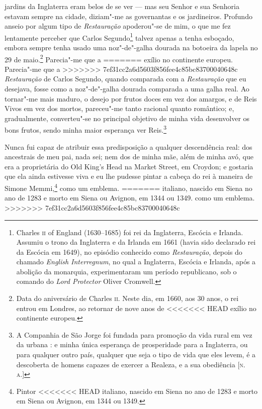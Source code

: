 {{{{{{{{{{jardins da Inglaterra eram belos de se ver --- mas seu Senhor e sua
Senhoria estavam sempre na cidade, diziam"-me as governantas e os
jardineiros. Profundo anseio por algum tipo de \textit{Restauração}
apoderou"-se de mim, o que me fez lentamente perceber que Carlos
Segundo\footnote{Charles \textsc{ii} of England (1630--1685) foi rei da Inglaterra, Escócia e Irlanda. Assumiu o trono da Inglaterra e da Irlanda em 1661
  (havia sido declarado rei da Escócia em 1649), no episódio conhecido
  como \textit{Restauração}, depois do chamado \textit{English Interregnum}, no
  qual a Inglaterra, Escócia e Irlanda, após a abolição da monarquia,
  experimentaram um período republicano, sob o comando do \textit{Lord
  Protector} Oliver Cromwell.} talvez apenas a tenha esboçado, embora
sempre tenha usado uma noz"-de"-galha dourada na botoeira da lapela no 29
de maio.\footnote{Data do aniversário de Charles \textsc{ii}. Neste dia, em 1660,
  aos 30 anos, o rei entrou em Londres, ao retornar de nove anos de
<<<<<<< HEAD
  exílio no continente europeu.} Parecia"-me que a
=======
  exílio no continente europeu.  Parecia"-me que a
>>>>>>> 7ef31cc2a6d5603f856fee4c85bc83700040648c
\textit{Restauração} de Carlos Segundo, quando comparada com a \textit{Restauração} que eu desejava, fosse como a noz"-de"-galha dourada comparada a uma galha real.
Ao tornar"-me mais maduro, o desejo por frutos doces em vez dos amargos,
e de Reis Vivos em vez dos mortos, pareceu"-me tanto racional quanto
romântico; e, gradualmente, converteu"-se no principal objetivo de minha
vida desenvolver os bons frutos, sendo minha maior esperança ver
Reis.\footnote{A Companhia de São Jorge foi fundada para promoção da vida
  rural em vez da urbana : e minha única esperança de prosperidade para
  a Inglaterra, ou para qualquer outro país, qualquer que seja o tipo de
  vida que eles levem, é a descoberta de homens capazes de exercer a
  Realeza, e a sua obediência {[}\textsc{n.\,a.}{]}}

Nunca fui capaz de atribuir essa predisposição a qualquer
descendência real: dos ancestrais de meu pai, nada sei; nem dos de minha
mãe, além de minha avó, que era a proprietária do Old King's Head na
Market Street, em Croydon; e gostaria que ela ainda estivesse viva e eu
lhe pudesse pintar a cabeça do rei à maneira de Simone Memmi,\footnote{Pintor
<<<<<<< HEAD
  italiano, nascido em Siena no ano de 1283 e morto em Siena ou Avignon, em 1344 ou 1349.} como um emblema.
=======
  italiano, nascido em Siena no ano de 1283 e morto em Siena ou Avignon, em 1344 ou 1349.  como um emblema.
>>>>>>> 7ef31cc2a6d5603f856fee4c85bc83700040648c

}}}}}}}}}}
